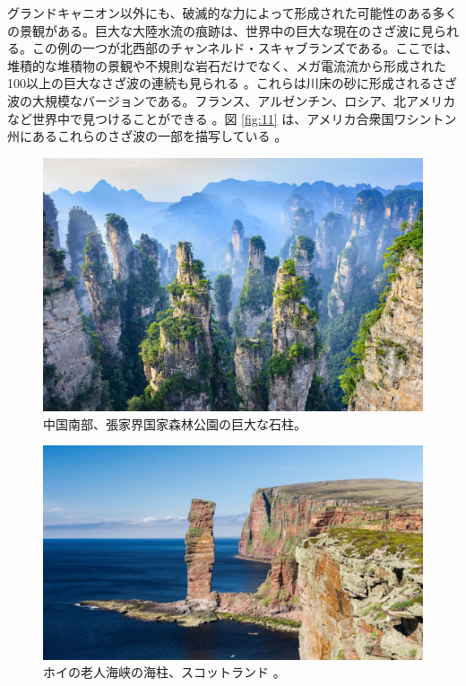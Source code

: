 \documentclass[10pt,twocolumn,letterpaper]{article}
\begin{document}
グランドキャニオン以外にも、破滅的な力によって形成された可能性のある多くの景観がある。巨大な大陸水流の痕跡は、世界中の巨大な現在のさざ波に見られる。この例の一つが北西部のチャンネルド・スキャブランズである。ここでは、堆積的な堆積物の景観や不規則な岩石だけでなく、メガ電流流から形成された100以上の巨大なさざ波の連続も見られる \cite{78,79}。これらは川床の砂に形成されるさざ波の大規模なバージョンである。フランス、アルゼンチン、ロシア、北アメリカなど世界中で見つけることができる \cite{81}。図 \ref{fig:11} は、アメリカ合衆国ワシントン州にあるこれらのさざ波の一部を描写している \cite{80}。

\begin{figure}[b]
\begin{center}
   \includegraphics[width=1\linewidth]{zhangjiajie.jpg}
\end{center}
   \caption{中国南部、張家界国家森林公園の巨大な石柱。}
\label{fig:12}
\label{fig:onecol}
\end{figure}

\begin{figure}[b]
\begin{center}
   \includegraphics[width=1\linewidth]{hoy.jpg}
\end{center}
   \caption{ホイの老人海峡の海柱、スコットランド \cite{83}。}
\label{fig:13}
\label{fig:onecol}
\end{figure}
\end{document}

